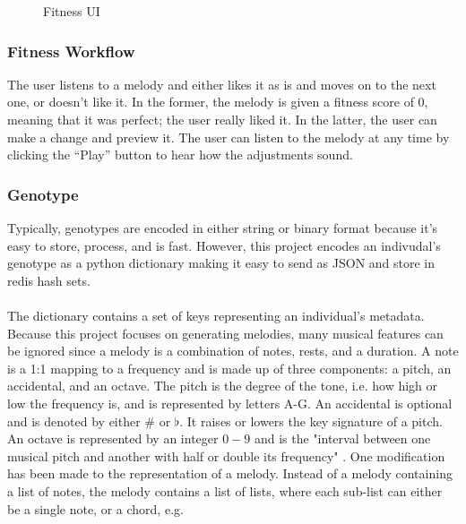 \documentclass[12pt]{article} %
\begin{document}
\begin{figure}[H]
\caption{Fitness UI}
\label{fig:fitness_ui}
\end{figure}

\subsubsection{Fitness Workflow}
The user listens to a melody and either likes it as is and moves on to the next one, or doesn't like it. In the former, the melody is given a fitness score of 0, meaning that it was perfect; the user really liked it. In the latter, the user can make a change and preview it. The user can listen to the melody at any time by clicking the “Play” button to hear how the adjustments sound.

\subsubsection{Genotype}
Typically, genotypes are encoded in either string or binary format because it's easy to store, process, and is fast. However, this project encodes an indivudal's genotype as a python dictionary making it easy to send as JSON and store in redis hash sets. \\
\\
The dictionary contains a set of keys representing an individual's metadata. Because this project focuses on generating melodies, many musical features can be ignored since a melody is a combination of notes, rests, and a duration. A note is a 1:1 mapping to a frequency and is made up of three components: a pitch, an accidental, and an octave.  The pitch is the degree of the tone, i.e. how high or low the frequency is, and is represented by letters A-G. An accidental is optional and is denoted by either $\#$ or $\flat$. It raises or lowers the key signature of a pitch. An octave is represented by an integer $0-9$ and is the "interval between one musical pitch and another with half or double its frequency" \cite{website:wiki_octave}. One modification has been made to the representation of a melody. Instead of a melody containing a list of notes, the melody contains a list of lists, where each sub-list can either be a single note, or a chord, e.g.
\end{document}
